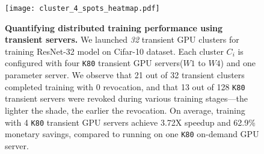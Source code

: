 \begin{figure}[t]
\centering
    \texttt{[image: cluster\_4\_spots\_heatmap.pdf]}
\caption{\textbf{Quantifying distributed training performance using transient servers.} We launched \emph{32} transient GPU clusters for training ResNet-32 model on Cifar-10 dataset. Each cluster $C_i$ is configured with four \texttt{K80} transient GPU servers($W1$ to $W4$) and one parameter server. We observe that 21 out of 32 transient clusters completed training with 0 revocation, and that 13 out of 128 \texttt{K80} transient servers were revoked during various training stages---the lighter the shade, the earlier the revocation. On average, training with 4 \texttt{K80} transient GPU servers achieve 3.72X speedup and 62.9\% monetary savings, compared to running on one \texttt{K80} on-demand GPU server.}  %
    \label{intro:motivation}
\end{figure}